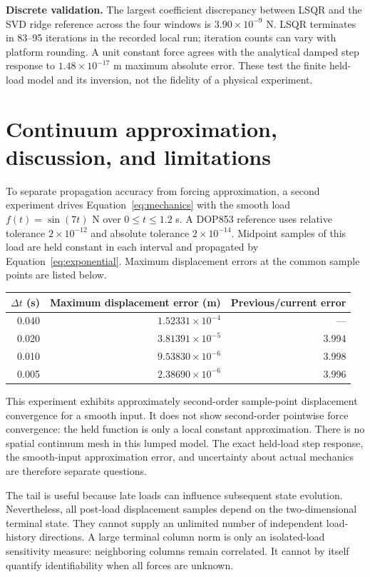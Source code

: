 \documentclass[10pt,a4paper]{article}
\begin{document}
\textbf{Discrete validation.} The largest coefficient discrepancy between
LSQR and the SVD ridge reference across the four windows is
$3.90\times10^{-9}$ N. LSQR terminates in 83--95 iterations in the recorded
local run; iteration counts can vary with platform rounding. A unit constant
force agrees with the analytical damped step response to
$1.48\times10^{-17}$ m maximum absolute error. These test the finite held-load
model and its inversion, not the fidelity of a physical experiment.

\newpage
\section{Continuum approximation, discussion, and limitations}
To separate propagation accuracy from forcing approximation, a second
experiment drives Equation~\eqref{eq:mechanics} with the smooth load
$f(t)=\sin(7t)$ N over $0\leq t\leq1.2$ s. A DOP853 reference uses relative
tolerance $2\times10^{-12}$ and absolute tolerance $2\times10^{-14}$.
Midpoint samples of this load are held constant in each interval and
propagated by Equation~\eqref{eq:exponential}. Maximum displacement errors
at the common sample points are listed below.

\begin{center}
\begin{tabular}{rrr}
\toprule
$\Delta t$ (s) & Maximum displacement error (m) & Previous/current error\\
\midrule
0.040 & $1.52331\times10^{-4}$ & ---\\
0.020 & $3.81391\times10^{-5}$ & 3.994\\
0.010 & $9.53830\times10^{-6}$ & 3.998\\
0.005 & $2.38690\times10^{-6}$ & 3.996\\
\bottomrule
\end{tabular}
\end{center}
This experiment exhibits approximately second-order sample-point
displacement convergence for a smooth input. It does not show second-order
pointwise force convergence: the held function is only a local constant
approximation. There is no spatial continuum mesh in this lumped model.
The exact held-load step response, the smooth-input approximation error,
and uncertainty about actual mechanics are therefore separate questions.

The tail is useful because late loads can influence subsequent state
evolution. Nevertheless, all post-load displacement samples depend on the
two-dimensional terminal state. They cannot supply an unlimited number of
independent load-history directions. A large terminal column norm is only
an isolated-load sensitivity measure: neighboring columns remain correlated.
It cannot by itself quantify identifiability when all forces are unknown.
\end{document}

